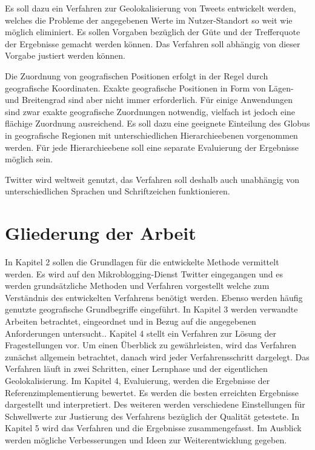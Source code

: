 		Es soll dazu ein Verfahren zur Geolokalisierung von Tweets entwickelt werden, welches die Probleme der angegebenen Werte im Nutzer-Standort so weit wie möglich eliminiert.
		Es sollen Vorgaben bezüglich der Güte und der Trefferquote der Ergebnisse gemacht werden können.
		Das Verfahren soll abhängig von dieser Vorgabe justiert werden können.

		Die Zuordnung von geografischen Positionen erfolgt in der Regel durch geografische Koordinaten.
		Exakte geografische Positionen in Form von Lägen- und Breitengrad sind aber nicht immer erforderlich. 
		Für einige Anwendungen sind zwar exakte geografische Zuordnungen notwendig, vielfach ist jedoch eine flächige Zuordnung ausreichend. 
		Es soll dazu eine geeignete Einteilung des Globus in geografische Regionen mit unterschiedlichen Hierarchieebenen vorgenommen werden.
		Für jede Hierarchieebene soll eine separate Evaluierung der Ergebnisse möglich sein.

		Twitter wird weltweit genutzt, das Verfahren soll deshalb auch unabhängig von unterschiedlichen Sprachen und Schriftzeichen funktionieren.
	
	\section{Gliederung der Arbeit}

			In Kapitel 2 sollen die Grundlagen für die entwickelte Methode vermittelt werden. 
			Es wird auf den Mikroblogging-Dienst Twitter eingegangen und es werden grundsätzliche Methoden und Verfahren vorgestellt welche zum Verständnis des entwickelten Verfahrens benötigt werden. 
			Ebenso werden häufig genutzte geografische Grundbegriffe eingeführt.
			In Kapitel 3 werden verwandte Arbeiten betrachtet, eingeordnet und in Bezug auf die angegebenen Anforderungen untersucht.. 
			Kapitel 4  stellt ein Verfahren zur Lösung der Fragestellungen vor. 
			Um einen Überblick zu gewährleisten, wird das Verfahren zunächst allgemein betrachtet, danach wird jeder Verfahrensschritt dargelegt.
			Das Verfahren läuft in zwei Schritten, einer Lernphase und der eigentlichen Geolokalisierung. 
			Im Kapitel 4, Evaluierung, werden die Ergebnisse der Referenzimplementierung bewertet.
			Es werden die besten erreichten Ergebnisse dargestellt und interpretiert. 
			Des weiteren werden verschiedene Einstellungen für Schwellwerte zur Justierung des Verfahrens bezüglich der Qualität getestete.
			In Kapitel 5 wird das Verfahren und die Ergebnisse zusammengefasst. 
			Im Ausblick werden mögliche Verbesserungen und Ideen zur Weiterentwicklung gegeben.  
